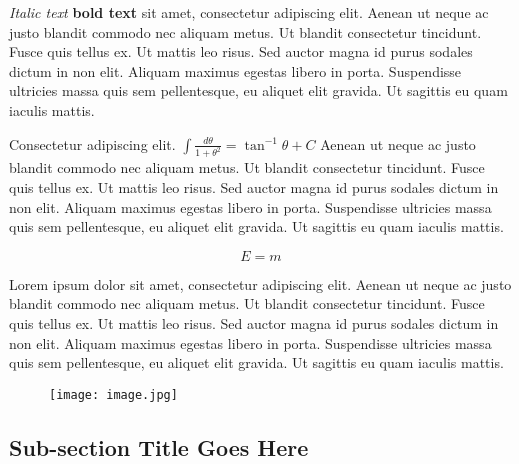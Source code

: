 \documentclass{csmagazine}
\begin{document}
\textit{Italic text} \textbf{bold text} sit amet, consectetur adipiscing elit. Aenean ut neque ac justo blandit commodo nec aliquam metus. Ut blandit consectetur tincidunt. Fusce quis tellus ex. Ut mattis leo risus. Sed auctor magna id purus sodales dictum in non elit. Aliquam maximus egestas libero in porta. Suspendisse ultricies massa quis sem pellentesque, eu aliquet elit gravida. Ut sagittis eu quam iaculis mattis.

Consectetur adipiscing elit. $\int\frac{d\theta} {1+\theta^2}=\tan^{-1} \theta+C$ Aenean ut neque ac justo blandit commodo nec aliquam metus. Ut blandit consectetur tincidunt. Fusce quis tellus ex. Ut mattis leo risus. Sed auctor magna id purus sodales dictum in non elit. Aliquam maximus egestas libero in porta. Suspendisse ultricies massa quis sem pellentesque, eu aliquet elit gravida. Ut sagittis eu quam iaculis mattis.

\begin{equation}
E=m
\end{equation}

Lorem ipsum dolor sit amet, consectetur adipiscing elit. Aenean ut neque ac justo blandit commodo nec aliquam metus. Ut blandit consectetur tincidunt. Fusce quis tellus ex. Ut mattis leo risus. Sed auctor magna id purus sodales dictum in non elit. Aliquam maximus egestas libero in porta. Suspendisse ultricies massa quis sem pellentesque, eu aliquet elit gravida. Ut sagittis eu quam iaculis mattis.


\begin{figure}[h!]
	\begin{center}	
	\texttt{[image: image.jpg]}
	\end{center}
\end{figure}

\subsection*{Sub-section Title Goes Here}
\end{document}
